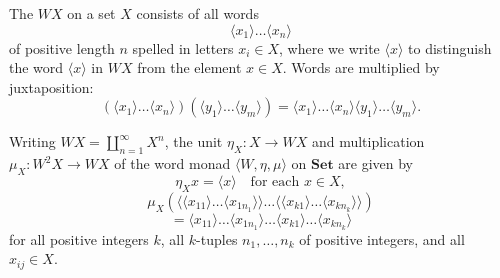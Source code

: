 The  $WX$ on a set $X$ consists of all words
$$\langle x_1 \rangle \ldots \langle x_n \rangle$$
of positive length $n$ spelled in letters $x_i \in X$, where we write $\langle x \rangle$ to distinguish the word $\langle x \rangle$ in $WX$ from the element $x \in X$. Words are multiplied by juxtaposition:
$$(\langle x_1 \rangle \ldots \langle x_n \rangle)(\langle y_1 \rangle \ldots \langle y_m \rangle) = \langle x_1 \rangle \ldots \langle x_n \rangle \langle y_1 \rangle \ldots \langle y_m \rangle.$$

Writing $WX = \coprod_{n=1}^{\infty} X^n$, the unit $\eta_X: X \to WX$ and multiplication $\mu_X: W^2 X \to WX$ of the word monad $\langle W, \eta, \mu \rangle$ on $\mathbf{Set}$ are given by
$$\eta_X x = \langle x \rangle \quad \text{for each } x \in X,$$
$$\mu_X(\langle \langle x_{11} \rangle \dots \langle x_{1n_1} \rangle \rangle \dots \langle \langle x_{k1} \rangle \dots \langle x_{kn_k} \rangle \rangle)$$
$$= \langle x_{11} \rangle \dots \langle x_{1n_1} \rangle \dots \langle x_{k1} \rangle \dots \langle x_{kn_k} \rangle$$
for all positive integers $k$, all $k$-tuples $n_1, \dots, n_k$ of positive integers, and all $x_{ij} \in X$.
